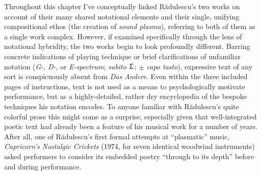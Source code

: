         Throughout this chapter I've conceptually linked R\u{a}dulescu's two works on account of their many shared notational elements and their single, unifying compositional ethos (the creation of \textit{sound plasma}), referring to both of them as a single work complex. However, if examined specifically through the lens of notational hybridity, the two works begin to look profoundly different. Barring concrete indications of playing technique or brief clarifications of unfamiliar notation (\textit{G-}, \textit{D-}, or \textit{E-spectrum}; \textit{subito $\Upsigma$}; $\pm$ \textit{capo tasto}), expressive text of any sort is conspicuously absent from \textit{Das Andere}. Even within the three included pages of instructions, text is not used as a means to psychologically motivate performance, but as a highly-detailed, rather dry encyclopedia of the bespoke techniques his notation encodes. To anyone familiar with R\u{a}dulescu's quite colorful prose this might come as a surprise, especially given that well-integrated poetic text had already been a feature of his musical work for a number of years. After all, one of R\u{a}dulescu's first formal attempts at ``plasmatic'' music, \textit{Capricorn's Nostalgic Crickets} (1974, for seven identical woodwind instruments) asked performers to consider its embedded poetry ``through to its depth'' before and during performance.\autocite[9]{Marinescu}

